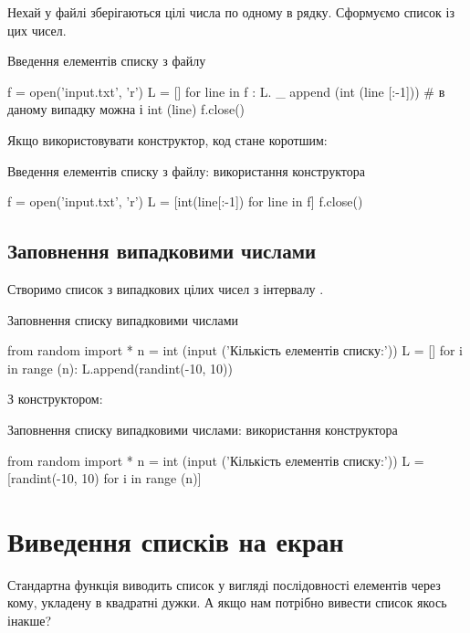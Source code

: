 Нехай у файлі  зберігаються цілі числа по одному в рядку. Сформуємо список із цих чисел.

\begin{defn}{Введення елементів списку з файлу}
\begin{py}{}
f = open('input.txt', 'r')
L = []
for line in f :
    L. _ append (int (line [:-1])) # в даному випадку можна і int (line)
f.close()
\end{py}
\end{defn}
\noindent Якщо використовувати конструктор, код стане коротшим:
\begin{defn}{Введення елементів списку з файлу: використання конструктора}
\begin{py}{}
f = open('input.txt', 'r')
L = [int(line[:-1]) for line in f]
f.close()
\end{py}
\end{defn}

\subsection{Заповнення випадковими числами} \label{inrand}

Створимо список з  випадкових цілих чисел з інтервалу .

\begin{defn}{Заповнення списку випадковими числами}
\begin{py}{}
from random import *
n = int (input ('Кількість елементів списку:'))
L = []
for i in range (n):
    L.append(randint(-10, 10))
\end{py}
\end{defn}
\noindent З конструктором:
\begin{defn}{Заповнення списку випадковими числами: використання конструктора}
\begin{py}{}
from random import *
n = int (input ('Кількість елементів списку:'))
L = [randint(-10, 10) for i in range (n)]
\end{py}
\end{defn}


\section{Виведення списків на екран}

Стандартна функція  виводить список у вигляді послідовності елементів через кому, укладену в квадратні дужки. А якщо нам потрібно вивести список якось інакше?

